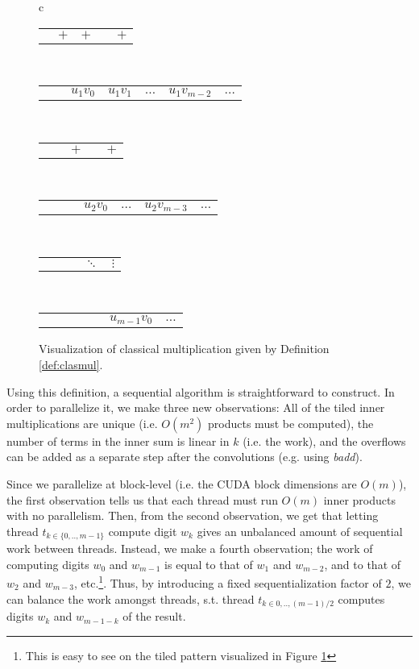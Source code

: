 \begin{figure}
\begin{tabular}{c}
\begin{tabular}{C{0.8cm}C{0.8cm}C{0.8cm}C{0.5cm}C{0.8cm}}
       & $+$ & $+$ &  & $+$
    \end{tabular}\\[-0.5ex]
    \begin{tabular}{C{0cm}C{0.8cm}C{0.8cm}C{0.8cm}C{0.5cm}C{0.8cm}C{0cm}}
       & & $u_1v_0$ & $u_1v_1$ & $\ldots$ & $u_1v_{m-2}$ & $\ldots$
    \end{tabular}\\[-0.5ex]
    \begin{tabular}{C{0.8cm}C{0.8cm}C{0.8cm}C{0.5cm}C{0.8cm}}
       & & $+$ &  & $+$
    \end{tabular}\\[-0.5ex]
    \begin{tabular}{C{0cm}C{0.8cm}C{0.8cm}C{0.8cm}C{0.5cm}C{0.8cm}C{0cm}}
       & & & $u_2v_0$ & $\ldots$ & $u_2v_{m-3}$ & $\ldots$
    \end{tabular}\\[-0.6ex]
    \begin{tabular}{C{0.8cm}C{0.8cm}C{0.8cm}C{0.5cm}C{0.8cm}}
       & & & $\ddots$ & $\vdots$
    \end{tabular}\\[-0.6ex]
    \begin{tabular}{C{0cm}C{0.8cm}C{0.8cm}C{0.8cm}C{0.5cm}C{0.8cm}C{0cm}}
       & & & & & $u_{m-1}v_0$ & $\ldots$
    \end{tabular}
  \end{tabular}
  \caption{\footnotesize Visualization of classical multiplication given by Definition \ref{def:clasmul}.}
  \label{fig:tiledmult}
\end{figure}

Using this definition, a sequential algorithm is straightforward to
construct. In order to parallelize it, we make three new observations: All of
the tiled inner multiplications are unique (i.e. $O(m^2)$ products must be
computed), the number of terms in the inner sum is linear in $k$ (i.e. the
work), and the overflows can be added as a separate step after the convolutions
(e.g. using \textit{badd}).

Since we parallelize at block-level (i.e. the CUDA block dimensions are $O(m)$),
the first observation tells us that each thread must run $O(m)$ inner products
with no parallelism. Then, from the second observation, we get that letting
thread $t_{k\in\{0,..,m-1\}}$ compute digit $w_k$ gives an unbalanced amount of
sequential work between threads. Instead, we make a fourth observation; the work
of computing digits $w_0$ and $w_{m-1}$ is equal to that of $w_1$ and $w_{m-2}$,
and to that of $w_2$ and $w_{m-3}$, etc.\footnote{This is easy to see on the
  tiled pattern visualized in Figure \ref{fig:tiledmult}}. Thus, by introducing
a fixed sequentialization factor of $2$, we can balance the work amongst
threads, s.t. thread $t_{k\in 0,..,(m-1)/2}$ computes digits $w_k$ and
$w_{m-1-k}$ of the result.


